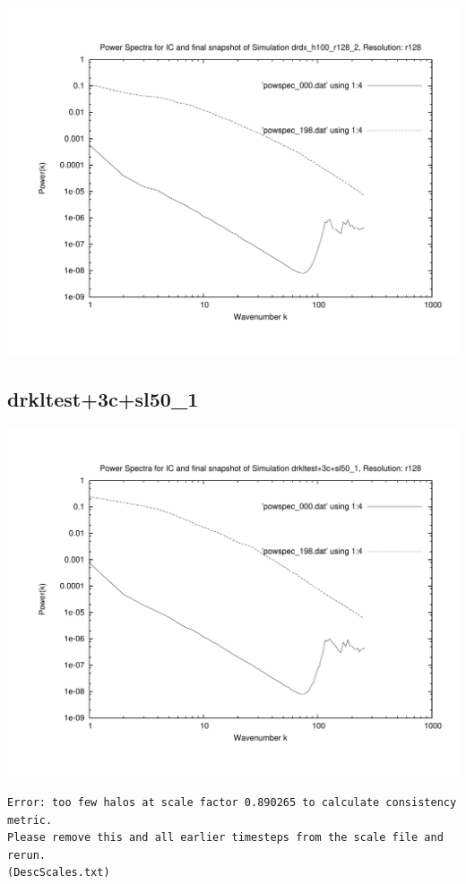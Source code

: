 \includegraphics[scale=0.5]{r128/drdx_h100_r128_2/plot_powspec_drdx_h100_r128_2.pdf}




\newpage
\subsection{drkltest+3c+sl50\_1}
\includegraphics[scale=0.5]{r128/drkltest+3c+sl50_1/plot_powspec_drkltest+3c+sl50_1.pdf}


\begin{verbatim}
Error: too few halos at scale factor 0.890265 to calculate consistency metric.
Please remove this and all earlier timesteps from the scale file and rerun.
(DescScales.txt)
\end{verbatim}

